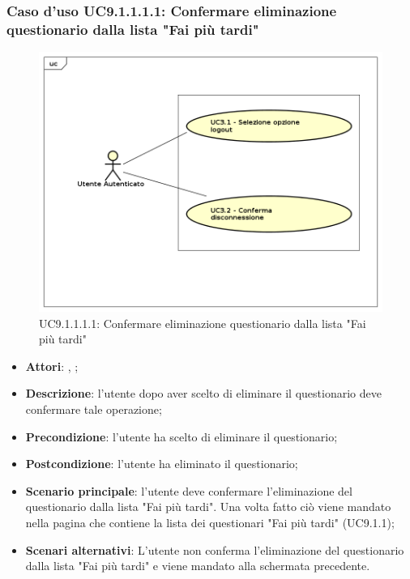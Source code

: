 					\subsubsection{Caso d'uso UC9.1.1.1.1: Confermare eliminazione questionario dalla lista "Fai più tardi"}
					\label{UC9.1.1.1.1}
					\begin{figure}[h]
						\centering
						\includegraphics[scale=0.5,keepaspectratio]{UML/UC9.png}
						\caption{UC9.1.1.1.1: Confermare eliminazione questionario dalla lista "Fai più tardi"}
					\end{figure}
					\FloatBarrier
					\begin{itemize}
						\item \textbf{Attori}: \uau, \uaupro;
						\item \textbf{Descrizione}: l'utente dopo aver scelto di eliminare il questionario deve confermare tale operazione;
						\item \textbf{Precondizione}: l'utente ha scelto di eliminare il questionario;
						\item \textbf{Postcondizione}: l'utente ha eliminato il questionario;
						\item \textbf{Scenario principale}: l'utente deve confermare l'eliminazione del questionario dalla lista "Fai più tardi". Una volta fatto ciò viene mandato nella pagina che contiene la lista dei questionari "Fai più tardi" (UC9.1.1);
						\item \textbf{Scenari alternativi}: L'utente non conferma l'eliminazione del questionario dalla lista "Fai più tardi" e viene mandato alla schermata precedente.
					\end{itemize}
							
